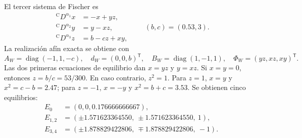 El tercer sistema de Fischer es
\begin{equation}
\begin{aligned}
 {}^{\mathrm C}D^{\alpha_1}x&=-x+yz,\\
 {}^{\mathrm C}D^{\alpha_2}y&=y-xz,\\
 {}^{\mathrm C}D^{\alpha_3}z&=b-cz+xy,
\end{aligned}
\qquad (b,c)=(0.53,3).
\label{ncbench:eq:fourwing}
\end{equation}
La realización afín exacta se obtiene con
\begin{equation}
 A_W=\operatorname{diag}(-1,1,-c),\quad
 d_W=(0,0,b)^{\mathsf T},\quad
 B_W=\operatorname{diag}(1,-1,1),\quad
 \Phi_W=(yz,xz,xy)^{\mathsf T}.
\end{equation}
Las dos primeras ecuaciones de equilibrio dan \(x=yz\) y \(y=xz\). Si
\(x=y=0\), entonces \(z=b/c=53/300\). En caso contrario, \(z^2=1\). Para
\(z=1\), \(x=y\) y \(x^2=c-b=2.47\); para \(z=-1\), \(x=-y\) y
\(x^2=b+c=3.53\). Se obtienen cinco equilibrios:
\begin{align}
 E_0&=(0,0,0.176666666667),\\
 E_{1,2}&=(\pm1.571623364550,\ \pm1.571623364550,\ 1),\\
 E_{3,4}&=(\pm1.878829422806,\ \mp1.878829422806,\ -1).
\end{align}

